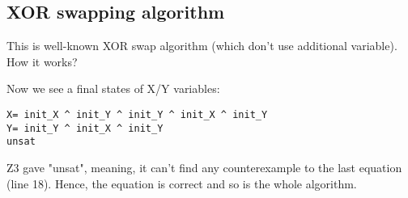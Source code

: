 \subsection{XOR swapping algorithm}

This is well-known XOR swap algorithm (which don't use additional variable).
How it works?



Now we see a final states of X/Y variables:

\begin{lstlisting}
X= init_X ^ init_Y ^ init_Y ^ init_X ^ init_Y
Y= init_Y ^ init_X ^ init_Y
unsat
\end{lstlisting}

Z3 gave "unsat", meaning, it can't find any counterexample to the last equation (line 18).
Hence, the equation is correct and so is the whole algorithm.


